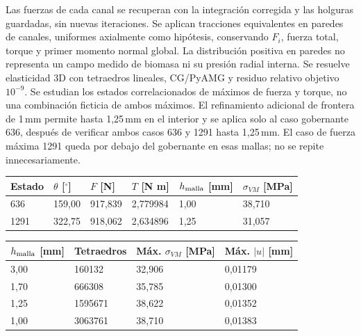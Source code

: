 Las fuerzas de cada canal se recuperan con la integración corregida y
las holguras guardadas, sin nuevas iteraciones. Se aplican tracciones
equivalentes en paredes de canales, uniformes axialmente como hipótesis,
conservando $F_i$, fuerza total, torque y primer momento normal global.
La distribución positiva en paredes no representa un campo medido de
biomasa ni su presión radial interna. Se resuelve elasticidad 3D con
tetraedros lineales, CG/PyAMG y residuo relativo objetivo $10^{-9}$.
Se estudian los estados correlacionados de máximos de fuerza y torque,
no una combinación ficticia de ambos máximos.
El refinamiento adicional de frontera de 1\,mm permite hasta 1,25\,mm en el
interior y se aplica solo al caso gobernante 636, después de verificar
ambos casos 636 y 1291 hasta 1,25\,mm. El caso de fuerza máxima 1291 queda
por debajo del gobernante en esas mallas; no se repite innecesariamente.
\begin{center}\begin{tabular}{llllll}\toprule
Estado & $\theta$ [$^\circ$] & $F$ [N] & $T$ [N m] & $h_{\rm malla}$ [mm] & $\sigma_{VM}$ [MPa]\\\midrule
636 & 159,00 & 917,839 & 2,779984 & 1,00 & 38,710\\
1291 & 322,75 & 918,062 & 2,634896 & 1,25 & 31,057\\
\bottomrule\end{tabular}\end{center}
\begin{center}\begin{tabular}{llll}\toprule
$h_{\rm malla}$ [mm] & Tetraedros & Máx. $\sigma_{VM}$ [MPa] & Máx. $|u|$ [mm]\\\midrule
3,00 & 160132 & 32,906 & 0,01179\\
1,70 & 666308 & 35,785 & 0,01300\\
1,25 & 1595671 & 38,622 & 0,01352\\
1,00 & 3063761 & 38,710 & 0,01383\\
\bottomrule\end{tabular}\end{center}

